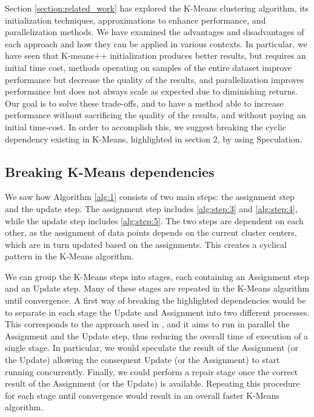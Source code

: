 Section \ref{section:related_work} has explored the K-Means clustering algorithm, its initialization techniques, approximations to enhance performance, and parallelization methods. We have examined the advantages and disadvantages of each approach and how they can be applied in various contexts. In particular, we have seen that K-means++ initialization produces better results, but requires an initial time cost, methods operating on samples of the entire dataset improve performance but decrease the quality of the results, and parallelization improves performance but does not always scale as expected due to diminishing returns. Our goal is to solve these trade-offs, and to have a method able to increase performance without sacrificing the quality of the results, and without paying an initial time-cost.  In order to accomplish this, we suggest breaking the cyclic dependency existing in K-Means, highlighted in section 2, by using Speculation. 

\subsection{Breaking K-Means dependencies}

We saw how Algorithm \ref{alg:1} consists of two main steps: the assignment step and the update step. The assignment step includes \ref{alg:step:3} and \ref{alg:step:4}, while the update step includes \ref{alg:step:5}. The two steps are dependent on each other, as the assignment of data points depends on the current cluster centers, which are in turn updated based on the assignments. This creates a cyclical pattern in the K-Means algorithm.

We can group the K-Means steps into stages, each containing an Assignment step and
an Update step. Many of these stages are repeated in the K-Means algorithm until convergence.
A first way of breaking the highlighted dependencies would be to separate in each stage the Update and Assignment into two different processes. This corresponds to the approach used in \cite{Sioulas:282304}, and it aims to run in parallel the Assignment and the Update step, thus reducing the overall time of execution of a single stage. In particular, we would speculate the result of the Assignment (or the Update) allowing the consequent Update (or the Assignment) to start running concurrently. Finally, we could perform a repair stage once the correct result of the Assignment (or the Update) is available. Repeating this procedure for each stage until convergence would result in an overall faster K-Means algorithm.

